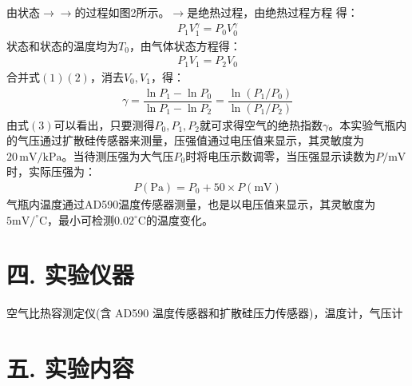 \documentclass[12pt,a4paper]{article}
\begin{document}
	由状态\uppercase\expandafter{}$\rightarrow $\uppercase\expandafter{}$\rightarrow $\uppercase\expandafter{}的过程如图2所示。\uppercase\expandafter{}$\rightarrow $\uppercase\expandafter{}是绝热过程，由绝热过程方程
	得：
	\begin{align}
		P_1V_1^\gamma=P_0V_0^\gamma
	\end{align}
	状态\uppercase\expandafter{}和状态\uppercase\expandafter{}的温度均为$T_0$，由气体状态方程得：
	\begin{align}
		P_1V_1=P_2V_0
	\end{align}
	合并式$(1)(2)$，消去$V_0,V_1$，得：
	\begin{align}
		\gamma=\dfrac{\ln{P_1}-\ln{P_0}}{\ln{P_1}-\ln{P_2}}=\dfrac{\ln{(P_1/P_0)}}{\ln{(P_1/P_2)}}
	\end{align}
	由式$(3)$可以看出，只要测得$P_0,P_1,P_2$就可求得空气的绝热指数$\gamma$。本实验气瓶内的气压通过扩散硅传感器来测量，压强值通过电压值来显示，其灵敏度为$20\,\mathrm{mV/kPa}$。当待测压强为大气压$P_0$时将电压示数调零，当压强显示读数为$P/\mathrm{mV}$时，实际压强为：
	\begin{align}
		P(\mathrm{Pa})=P_0+50\times P(\mathrm{mV})
	\end{align}
	气瓶内温度通过AD590温度传感器测量，也是以电压值来显示，其灵敏度为$5\mathrm{mV}/^{\circ}\mathrm{C}$，最小可检测$0.02^{\circ}\mathrm{C}$的温度变化。
	
	\section*{\textbf{{四. 实验仪器}}}
	空气比热容测定仪(含 AD590 温度传感器和扩散硅压力传感器)，温度计，气压计

	\section*{\textbf{{五. 实验内容}}}
\end{document}
